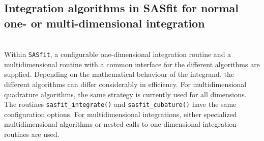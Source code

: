 \subsection{Integration algorithms in SASfit for normal one- or multi-dimensional integration}  ~\\

Within \texttt{SASfit}, a configurable one-dimensional integration routine and a multidimensional routine with a common interface for the different algorithms are supplied. Depending on the mathematical behaviour of the integrand, the different algorithms can differ considerably in efficiency. For multidimensional quadrature algorithms, the same strategy is currently used for all dimensions. The routines \texttt{sasfit\_integrate()} and \texttt{sasfit\_cubature()} have the same configuration options. For multidimensional integrations, either specialized multidimensional algorithms or nested calls to one-dimensional integration routines are used. \\

